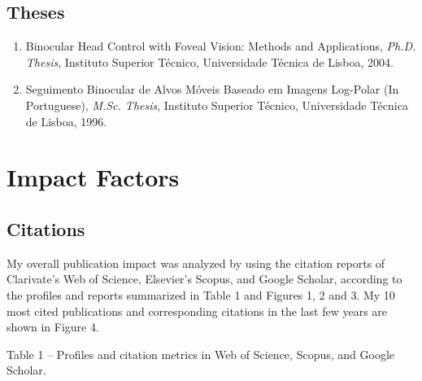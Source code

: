 \documentclass[
]{article}
\begin{document}
\subsection{Theses}\label{theses}

\begin{enumerate}
\def\labelenumi{\arabic{enumi}.}
\item
  Binocular Head Control with Foveal Vision: Methods and Applications,
  \emph{Ph.D. Thesis}, Instituto Superior Técnico, Universidade Técnica
  de Lisboa, 2004.
\item
  Seguimento Binocular de Alvos Móveis Baseado em Imagens Log-Polar (In
  Portuguese), \emph{M.Sc. Thesis}, Instituto Superior Técnico,
  Universidade Técnica de Lisboa, 1996.
\end{enumerate}

\section{Impact Factors}\label{impact-factors}

\subsection{Citations}\label{citations}

My overall publication impact was analyzed by using the citation reports
of Clarivate's Web of Science, Elsevier's Scopus, and Google Scholar,
according to the profiles and reports summarized in Table 1 and Figures
1, 2 and 3. My 10 most cited publications and corresponding citations in
the last few years are shown in Figure 4.

Table 1 -- Profiles and citation metrics in Web of Science, Scopus, and
Google Scholar.
\end{document}
